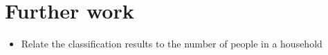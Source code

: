 \chapter{Further work}
\begin{itemize}
\item Relate the classification results to the number of people in a household
\end{itemize}